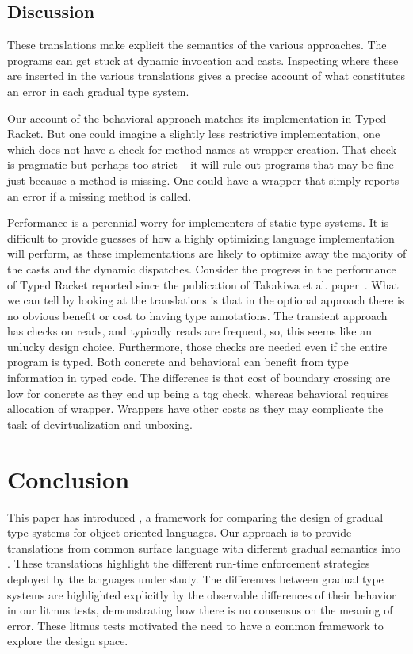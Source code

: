 \documentclass[USenglish]{tex/lipics-v2016}
\begin{document}
\subsection{Discussion}

These translations make explicit the semantics of the various approaches.  The
programs can get stuck at dynamic invocation and casts. Inspecting where these
are inserted in the various translations gives a precise account of what
constitutes an error in each gradual type system.

Our account of the behavioral approach matches its implementation in Typed
Racket. But one could imagine a slightly less restrictive implementation,
one which does not have a check for method names at wrapper creation.  That
check is pragmatic but perhaps too strict -- it will rule out programs that
may be fine just because a method is missing. One could have a wrapper that
simply reports an error if a missing method is called.

Performance is a perennial worry for implementers of static type systems.
It is difficult to provide guesses of how a highly optimizing language
implementation will perform, as these implementations are likely to optimize
away the majority of the casts and the dynamic dispatches. Consider the
progress in the performance of Typed Racket reported since the publication
of Takakiwa et al. paper~\cite{popl16}.  What we can tell by looking at the
translations is that in the optional approach there is no obvious benefit or
cost to having type annotations. The transient approach has checks on reads,
and typically reads are frequent, so, this seems like an unlucky design
choice. Furthermore, those checks are needed even if the entire program is
typed. Both concrete and behavioral can benefit from type information in
typed code.  The difference is that cost of boundary crossing are low for
concrete as they end up being a tqg check, whereas behavioral requires
allocation of wrapper. Wrappers have other costs as they may complicate
the task of devirtualization and unboxing.


\section{Conclusion}

This paper has introduced \kafka, a framework for comparing the design of
gradual type systems for object-oriented languages. Our approach is to
provide translations from common surface language with different gradual
semantics into \kafka. These translations highlight the different run-time
enforcement strategies deployed by the languages under study. The
differences between gradual type systems are highlighted explicitly by the
observable differences of their behavior in our litmus tests, demonstrating
how there is no consensus on the meaning of error.  These litmus tests
motivated the need to have a common framework to explore the design space.
\end{document}

